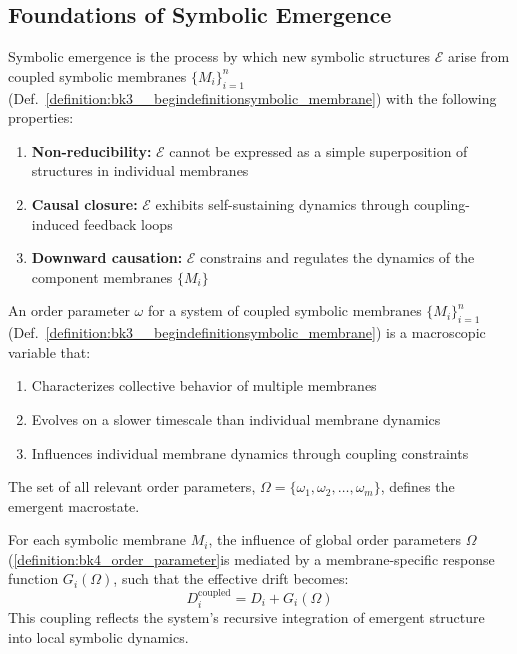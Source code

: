 \subsection{Foundations of Symbolic Emergence} \label{subsec:bk4_foundations_symbolic_emergence}
\begin{definition}
\label{definition:bk4_symbolic_emergence}
Symbolic emergence is the process by which new symbolic structures $\mathcal{E}$ arise from coupled symbolic membranes $\{M_i\}_{i=1}^{n}$ (Def.~\ref{definition:bk3__begindefinitionsymbolic_membrane}) with the following properties:
\begin{enumerate}
    \item \textbf{Non-reducibility:} $\mathcal{E}$ cannot be expressed as a simple superposition of structures in individual membranes
    \item \textbf{Causal closure:} $\mathcal{E}$ exhibits self-sustaining dynamics through coupling-induced feedback loops
    \item \textbf{Downward causation:} $\mathcal{E}$ constrains and regulates the dynamics of the component membranes $\{M_i\}$
\end{enumerate}
\end{definition}
\begin{definition}
\label{definition:bk4_order_parameter}
An order parameter $\omega$ for a system of coupled symbolic membranes $\{M_i\}_{i=1}^{n}$ (Def.~\ref{definition:bk3__begindefinitionsymbolic_membrane}) is a macroscopic variable that:
\begin{enumerate}
    \item Characterizes collective behavior of multiple membranes
    \item Evolves on a slower timescale than individual membrane dynamics
    \item Influences individual membrane dynamics through coupling constraints
\end{enumerate}
The set of all relevant order parameters, $\Omega = \{\omega_1, \omega_2, \ldots, \omega_m\}$, defines the emergent macrostate.
\end{definition}
\begin{axiom}
\label{axiom:bk4_membrane_coupling_response}
For each symbolic membrane \( M_i \), the influence of global order parameters \( \Omega \) (\ref{definition:bk4_order_parameter}is mediated by a membrane-specific response function \( G_i(\Omega) \), such that the effective drift becomes:
\[
D_i^{\text{coupled}} = D_i + G_i(\Omega)
\]
This coupling reflects the system's recursive integration of emergent structure into local symbolic dynamics.
\end{axiom}
